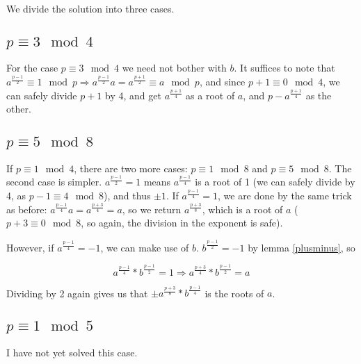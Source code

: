 \documentclass{article}
\begin{document}
We divide the solution into three cases.

\subsection{$p \equiv 3 \mod 4$}
For the case $p \equiv 3 \mod 4$ we need not bother with $b$. It suffices to
note that $a^{\frac{p-1}{2}} \equiv 1 \mod p \Rightarrow a^{\frac{p-1}{2}}a
= a^{\frac{p+1}{2}} \equiv a \mod p$, and since $p + 1 \equiv 0 \mod 4$, we can
safely divide $p+1$ by 4, and get $a^{\frac{p+1}{4}}$ as a root of $a$, and
$p - a^{\frac{p+1}{4}}$ as the other.

\subsection{$p \equiv 5 \mod 8$}

If $p \equiv 1 \mod 4$, there are two more cases: $p \equiv 1 \mod 8$ and $p
\equiv 5 \mod 8$. The second case is simpler. $a^{\frac{p-1}{2}} = 1$ means
$a^{\frac{p-1}{4}}$ is a root of 1 (we can safely divide by 4, as $p -1 \equiv 4
\mod 8$), and thus $\pm 1$. If $a^{\frac{p-1}{4}} = 1$, we are done by the same
trick as before: $a^{\frac{p-1}{4}}a = a^{\frac{p+3}{4}} = a$, so we return
$a^{\frac{p+3}{8}}$, which is a root of $a$ ($p+3 \equiv 0 \mod 8$, so again,
the division in the exponent is safe).

However, if $a^{\frac{p-1}{4}} = -1$, we
can make use of $b$. $b^{\frac{p-1}{2}} = -1$ by lemma \ref{plusminus}, so

$$a^{\frac{p-1}{4}} * b^{\frac{p-1}{2}} = 1 \Rightarrow a^{\frac{p+3}{4}} *
b^{\frac{p-1}{2}} = a $$

Dividing by 2 again gives us that $\pm a^{\frac{p+3}{8}} * b^{\frac{p-1}{4}}$ is
the roots of $a$.


\subsection{$p \equiv 1 \mod 5$}
I have not yet solved this case.
\end{document}
